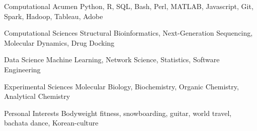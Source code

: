 \vspace{2mm}

\begin{cvskills}

  \cvskill
    {Computational Acumen} %
    {Python, R, SQL, Bash, Perl, MATLAB, Javascript, Git, Spark, Hadoop, Tableau, Adobe} %
    
  \cvskill
    {Computational Sciences} %
    {Structural Bioinformatics, Next-Generation Sequencing, Molecular Dynamics, Drug Docking} %
     
  \cvskill
    {Data Science} %
    {Machine Learning, Network Science, Statistics, Software Engineering} %
    
  \cvskill
    {Experimental Sciences} %
    {Molecular Biology, Biochemistry, Organic Chemistry, Analytical Chemistry} %

  \cvskill
    {Personal Interests} %
    {Bodyweight fitness, snowboarding, guitar, world travel, bachata dance, Korean-culture} %
    
\vspace{-8.0mm}
\end{cvskills}